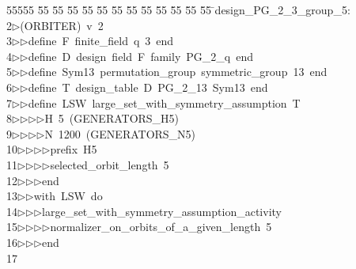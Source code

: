 %
%
\begin{tabbing}
55555 \= 55 \= 55 \= 55 \= 55 \= 55 \= 55 \= 55 \= 55 \= 55 \= 55 \= 55 \= 55 \= \>design\_PG\_2\_3\_group\_5:\\[0pt]
2\>$\triangleright$\>(ORBITER)\ v\ 2\ \\[0pt]
3\>$\triangleright$\>$\triangleright$\>define\ F\ finite\_field\ q\ 3\ end\ \\[0pt]
4\>$\triangleright$\>$\triangleright$\>define\ D\ design\ field\ F\ family\ PG\_2\_q\ end\ \\[0pt]
5\>$\triangleright$\>$\triangleright$\>define\ Sym13\ permutation\_group\ symmetric\_group\ 13\ end\ \\[0pt]
6\>$\triangleright$\>$\triangleright$\>define\ T\ design\_table\ D\ PG\_2\_13\ Sym13\ end\ \\[0pt]
7\>$\triangleright$\>$\triangleright$\>define\ LSW\ large\_set\_with\_symmetry\_assumption\ T\ \\[0pt]
8\>$\triangleright$\>$\triangleright$\>$\triangleright$\>$\triangleright$\>H\ 5\ (GENERATORS\_H5)\ \\[0pt]
9\>$\triangleright$\>$\triangleright$\>$\triangleright$\>$\triangleright$\>N\ 1200\ (GENERATORS\_N5)\ \\[0pt]
10\>$\triangleright$\>$\triangleright$\>$\triangleright$\>$\triangleright$\>prefix\ H5\ \\[0pt]
11\>$\triangleright$\>$\triangleright$\>$\triangleright$\>$\triangleright$\>selected\_orbit\_length\ 5\ \\[0pt]
12\>$\triangleright$\>$\triangleright$\>$\triangleright$\>end\ \\[0pt]
13\>$\triangleright$\>$\triangleright$\>with\ LSW\ do\ \\[0pt]
14\>$\triangleright$\>$\triangleright$\>$\triangleright$\>large\_set\_with\_symmetry\_assumption\_activity\ \\[0pt]
15\>$\triangleright$\>$\triangleright$\>$\triangleright$\>$\triangleright$\>normalizer\_on\_orbits\_of\_a\_given\_length\ 5\ \\[0pt]
16\>$\triangleright$\>$\triangleright$\>$\triangleright$\>end\\[0pt]
17\>\end{tabbing}
